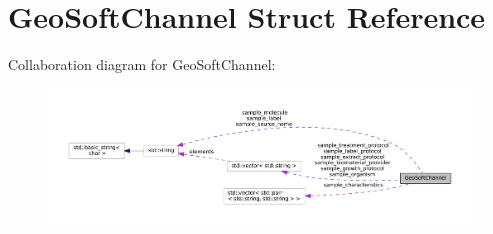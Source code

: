 \hypertarget{structGeoSoftChannel}{}\section{Geo\+Soft\+Channel Struct Reference}
\label{structGeoSoftChannel}


Collaboration diagram for Geo\+Soft\+Channel\+:\nopagebreak
\begin{figure}[H]
\begin{center}
\leavevmode
\includegraphics[width=350pt]{structGeoSoftChannel__coll__graph}
\end{center}
\end{figure}
